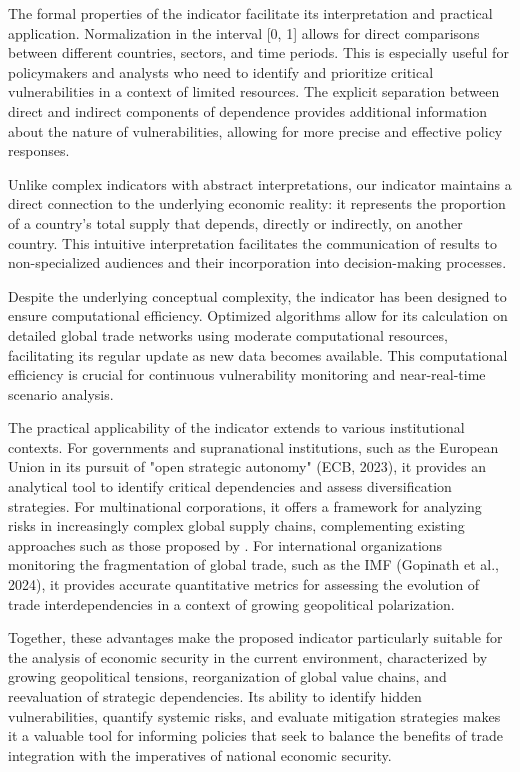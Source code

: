 \documentclass[final,1p,times,authoryear]{elsarticle}
\begin{document}
The formal properties of the indicator facilitate its interpretation and practical application. Normalization in the interval [0, 1] allows for direct comparisons between different countries, sectors, and time periods. This is especially useful for policymakers and analysts who need to identify and prioritize critical vulnerabilities in a context of limited resources. The explicit separation between direct and indirect components of dependence provides additional information about the nature of vulnerabilities, allowing for more precise and effective policy responses.

Unlike complex indicators with abstract interpretations, our indicator maintains a direct connection to the underlying economic reality: it represents the proportion of a country’s total supply that depends, directly or indirectly, on another country. This intuitive interpretation facilitates the communication of results to non-specialized audiences and their incorporation into decision-making processes.

Despite the underlying conceptual complexity, the indicator has been designed to ensure computational efficiency. Optimized algorithms allow for its calculation on detailed global trade networks using moderate computational resources, facilitating its regular update as new data becomes available. This computational efficiency is crucial for continuous vulnerability monitoring and near-real-time scenario analysis.

The practical applicability of the indicator extends to various institutional contexts. For governments and supranational institutions, such as the European Union in its pursuit of "open strategic autonomy" (ECB, 2023), it provides an analytical tool to identify critical dependencies and assess diversification strategies. For multinational corporations, it offers a framework for analyzing risks in increasingly complex global supply chains, complementing existing approaches such as those proposed by \citet{StollThethi2022}. For international organizations monitoring the fragmentation of global trade, such as the IMF (Gopinath et al., 2024), it provides accurate quantitative metrics for assessing the evolution of trade interdependencies in a context of growing geopolitical polarization.

Together, these advantages make the proposed indicator particularly suitable for the analysis of economic security in the current environment, characterized by growing geopolitical tensions, reorganization of global value chains, and reevaluation of strategic dependencies. Its ability to identify hidden vulnerabilities, quantify systemic risks, and evaluate mitigation strategies makes it a valuable tool for informing policies that seek to balance the benefits of trade integration with the imperatives of national economic security.
\end{document}

